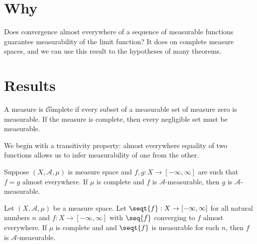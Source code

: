 

\section*{Why}

Does convergence almost everywhere of a sequence of measurable functions guarantee measurability of the limit function?
It does on complete measure spaces, and we can use this result to  the hypotheses of many theorems.

\section*{Results}

A measure is \t{complete} if every subset of a measurable set of measure zero is measurable.
If the measure is complete, then every negligible set must be measurable.

We begin with a transitivity property: almost everywhere equality of two functions allows us to infer measurability of one from the other.

\begin{proposition}
Suppose $(X, \mathcal{A} , \mu )$ is measure space and $f,g: X \to [-\infty, \infty]$ are such that $f = g$ almost everywhere.
If $\mu $ is complete and $f$ is $\mathcal{A} $-measurable, then $g$ is $\mathcal{A} $-measurable.\end{proposition}
\begin{proposition}
Let $(X, \mathcal{A} , \mu )$ be a measure space.
Let $\seqt{f}: X \to [-\infty, \infty]$ for all
natural numbers $n$
and $f: X \to [-\infty, \infty]$
with
$\seq{f}$ converging to $f$ almost everywhere.
If $\mu $ is complete and
and $\seqt{f}$ is measurable for each $n$,
then $f$ is $\mathcal{A} $-measurable.\end{proposition}
\blankpage